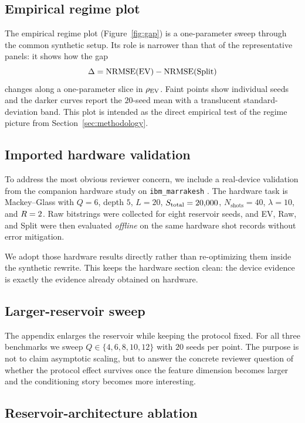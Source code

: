 \subsection{Empirical regime plot}

The empirical regime plot (Figure~\ref{fig:gap}) is a one-parameter sweep through the common synthetic setup. Its role is narrower than that of the representative panels: it shows how the gap
\[
\Delta = \mathrm{NRMSE}(\mathrm{EV})-\mathrm{NRMSE}(\mathrm{Split})
\]
changes along a one-parameter slice in $\rho_{\mathrm{EV}}$. Faint points show individual seeds and the darker curves report the $20$-seed mean with a translucent standard-deviation band. This plot is intended as the direct empirical test of the regime picture from Section~\ref{sec:methodology}.

\subsection{Imported hardware validation}

To address the most obvious reviewer concern, we include a real-device validation from the companion hardware study on \texttt{ibm\_marrakesh} \cite{ahmed2025optimal}. The hardware task is Mackey--Glass with $Q=6$, depth $5$, $L=20$, $S_{\mathrm{total}}=20{,}000$, $N_{\mathrm{shots}}=40$, $\lambda=10$, and $R=2$. Raw bitstrings were collected for eight reservoir seeds, and EV, Raw, and Split were then evaluated \emph{offline} on the same hardware shot records without error mitigation.

We adopt those hardware results directly rather than re-optimizing them inside the synthetic rewrite. This keeps the hardware section clean: the device evidence is exactly the evidence already obtained on hardware.

\subsection{Larger-reservoir sweep}

The appendix enlarges the reservoir while keeping the protocol fixed. For all three benchmarks we sweep $Q\in\{4,6,8,10,12\}$ with $20$ seeds per point. The purpose is not to claim asymptotic scaling, but to answer the concrete reviewer question of whether the protocol effect survives once the feature dimension becomes larger and the conditioning story becomes more interesting.

\subsection{Reservoir-architecture ablation}


